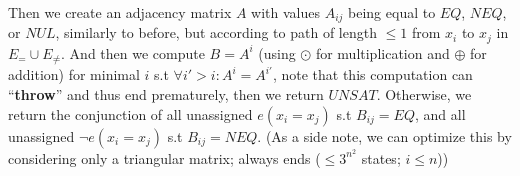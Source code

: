 \documentclass[a4paper,12pt]{article} %
\begin{document}
Then we create an adjacency matrix $A$ with values $A_{ij}$ being equal to $EQ$, $NEQ$, or $NUL$, similarly to before, but according to path of length $\leq1$ from $x_i$ to $x_j$ in $E_= \cup E_{\neq}$. And then we compute $B = A^i$ (using $\odot$ for multiplication and $\oplus$ for addition) for minimal $i$ s.t $\forall i' > i: A^i = A^{i'}$, note that this computation can ``\textbf{throw}'' and thus end prematurely, then we return $UNSAT$. Otherwise, we return the conjunction of all unassigned $e(x_i = x_j)$ s.t $B_{ij} = EQ$, and all unassigned $\neg e(x_i = x_j)$ s.t $B_{ij} = NEQ$. (As a side note, we can optimize this by considering only a triangular matrix; always ends ($\leq 3^{n^2}$ states; $i \leq n$))
\end{document}
